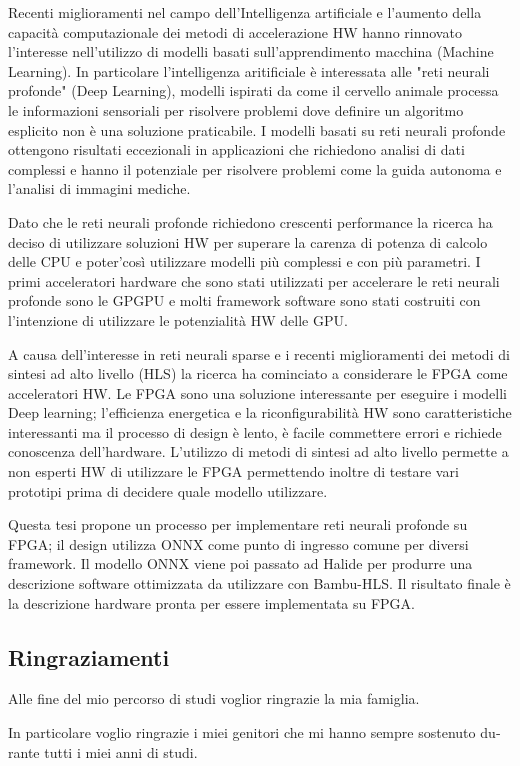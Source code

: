 \documentclass[11pt, a4paper, twoside, openright]{report}
\begin{document}
Recenti miglioramenti nel campo dell'Intelligenza artificiale e l'aumento della capacità computazionale dei metodi di accelerazione HW hanno rinnovato l'interesse nell'utilizzo di modelli basati sull'apprendimento macchina (Machine Learning).
In particolare l'intelligenza aritificiale è interessata alle "reti neurali profonde" (Deep Learning), modelli ispirati da come il cervello animale processa le informazioni sensoriali per risolvere problemi dove definire un algoritmo esplicito non è una soluzione praticabile.
I modelli basati su reti neurali profonde ottengono risultati eccezionali in applicazioni che richiedono analisi di dati complessi e hanno il potenziale per risolvere problemi come la guida autonoma e l'analisi di immagini mediche.

Dato che le reti neurali profonde richiedono crescenti performance la ricerca ha deciso di utilizzare soluzioni HW per superare la carenza di potenza di calcolo delle CPU e poter'così utilizzare modelli più complessi e con più parametri.
I primi acceleratori hardware che sono stati utilizzati per accelerare le reti neurali profonde sono le GPGPU e molti framework software sono stati costruiti con l'intenzione di utilizzare le potenzialità HW delle GPU.

A causa dell'interesse in reti neurali sparse e i recenti miglioramenti dei metodi di sintesi ad alto livello (HLS) la ricerca ha cominciato a considerare le FPGA come acceleratori HW.
Le FPGA sono una soluzione interessante per eseguire i modelli Deep learning; l'efficienza energetica e la riconfigurabilità HW sono caratteristiche interessanti ma il processo di design è lento, è facile commettere errori e richiede conoscenza dell'hardware.
L'utilizzo di metodi di sintesi ad alto livello permette a non esperti HW di utilizzare le FPGA permettendo inoltre di testare vari prototipi prima di decidere quale modello utilizzare.

Questa tesi propone un processo per implementare reti neurali profonde su FPGA; il design utilizza ONNX come punto di ingresso comune per diversi framework.
Il modello ONNX viene poi passato ad Halide per produrre una descrizione software ottimizzata da utilizzare con Bambu-HLS.
Il risultato finale è la descrizione hardware pronta per essere implementata su FPGA.


\begin{otherlanguage}{italian}

\newpage

\chapter*{Ringraziamenti}

Alle fine del mio percorso di studi voglior ringrazie la mia famiglia.

In particolare voglio ringrazie i miei genitori che mi hanno sempre sostenuto durante tutti i miei anni di studi.

\newpage

\end{otherlanguage}
\end{document}
